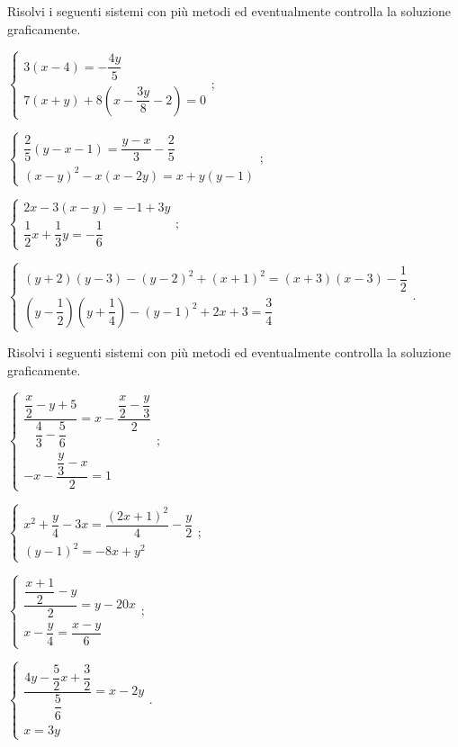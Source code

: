 \begin{esercizio}[\Ast]
 \label{ese:22.75}
 Risolvi i seguenti sistemi con più metodi ed eventualmente controlla
la soluzione graficamente.

\begin{enumeratea}
 {\longarray
\item $\left\{\begin{array}{l}3(x-4)=-{\dfrac{4y}{5}}\\7(x+y)+8\left(x-\dfrac{3y}{8}-2\right)=0\end{array}\right.;$
\item $\left\{\begin{array}{l}\dfrac{2}{5}(y-x-1)=\dfrac{y-x}{3}-\dfrac{2}{5}\\(x-y)^{2}-x(x-2y)=x+y(y-1)\end{array}\right.;$
\item $\left\{\begin{array}{l}2x-3(x-y)=-1+3y\\\dfrac{1}{2}x+\dfrac{1}{3}y=-{\dfrac{1}{6}}\end{array}\right.;$
\item $\left\{\begin{array}{l}(y+2)(y-3)-(y-2)^{2}+(x+1)^{2}=(x+3)(x-3)-\dfrac{1}{2}\\\left(y-\dfrac{1}{2}\right)\left(y+\dfrac{1}{4}\right)-(y-1)^{2}+2x+3=\dfrac{3}{4}\end{array}\right..$}
\end{enumeratea}
\end{esercizio}
\begin{esercizio}[\Ast]
 \label{ese:22.76}
 Risolvi i seguenti sistemi con più metodi ed eventualmente controlla
la soluzione graficamente.
\begin{multicols}{2}
\begin{enumeratea}
 {\longarray
\item $\left\{\begin{array}{l}\dfrac{\dfrac{x}{2}-y+5}{\dfrac{4}{3}-\dfrac{5}{6}}=x-\dfrac{\dfrac{x}{2}-\dfrac{y}{3}}{2}\\-x-\dfrac{\dfrac{y}{3}-x}{2}=1\end{array}\right.;$
\item $\left\{\begin{array}{l}x^{2}+\dfrac{y}{4}-3x=\dfrac{(2x+1)^{2}}{4}-\dfrac{y}{2}\\(y-1)^{2}=-8x+y^{2}\end{array}\right.;$
\item $\left\{\begin{array}{l}\dfrac{\dfrac{x+1}{2}-y}{2}=y-20x\\x-\dfrac{y}{4}=\dfrac{x-y}{6}\end{array}\right.;$
\item $\left\{\begin{array}{l}\dfrac{4y-\dfrac{5}{2}x+\dfrac{3}{2}}{\dfrac{5}{6}}=x-2y\\x=3y\end{array}\right..$}
\end{enumeratea}
\end{multicols}
\end{esercizio}

